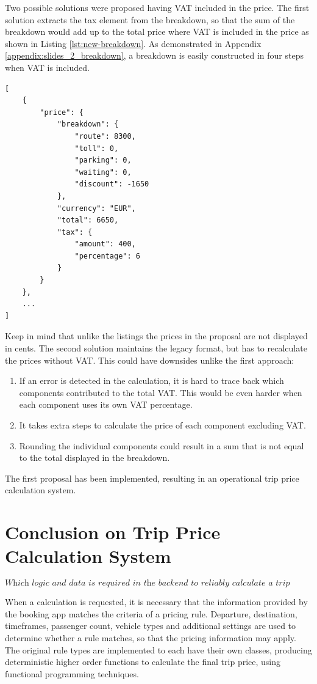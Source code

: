 Two possible solutions were proposed having VAT included in the price. The first solution extracts the tax element from the breakdown, so that the sum of the breakdown would add up to the total price where VAT is included in the price as shown in Listing \ref{lst:new-breakdown}. As demonstrated in Appendix \ref{appendix:slides_2_breakdown}, a breakdown is easily constructed in four steps when VAT is included.

\begin{center}
\noindent\begin{minipage}{.85\textwidth}
\begin{lstlisting}[caption={Improved price breakdown}, label={lst:new-breakdown}]
[
	{
		"price": {
			"breakdown": {
				"route": 8300,
				"toll": 0,
				"parking": 0,
				"waiting": 0,
				"discount": -1650
			},
			"currency": "EUR",
			"total": 6650,
			"tax": {
				"amount": 400,
				"percentage": 6
			}
		}
	},
	...
]
\end{lstlisting}
\end{minipage}
\end{center}

Keep in mind that unlike the listings the prices in the proposal are not displayed in cents. The second solution maintains the legacy format, but has to recalculate the prices without VAT. This could have downsides unlike the first approach:

\begin{enumerate}
	\item If an error is detected in the calculation, it is hard to trace back which components contributed to the total VAT. This would be even harder when each component uses its own VAT percentage.
	\item It takes extra steps to calculate the price of each component excluding VAT.
	\item Rounding the individual components could result in a sum that is not equal to the total displayed in the breakdown.
\end{enumerate}

The first proposal has been implemented, resulting in an operational trip price calculation system.

\section{Conclusion on Trip Price Calculation System}
\[\textit{Which logic and data is required in the backend to reliably calculate a trip price?}\]\hfill

When a calculation is requested, it is necessary that the information provided by the booking app matches the criteria of a pricing rule. Departure, destination, timeframes, passenger count, vehicle types and additional settings are used to determine whether a rule matches, so that the pricing information may apply. The original rule types are implemented to each have their own classes, producing deterministic higher order functions to calculate the final trip price, using functional programming techniques.
